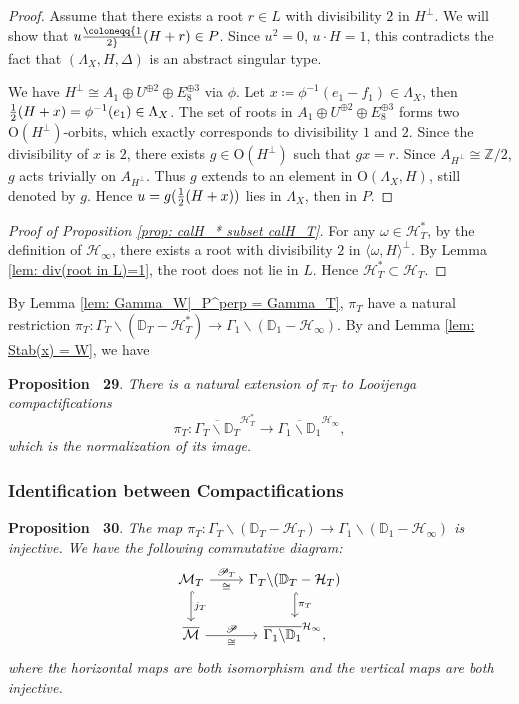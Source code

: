 \documentclass[
]{article}
\begin{document}
\emph{Proof.} Assume that there exists a root \(r\in L\) with
divisibility \(2\) in \(H^\perp\). We will show that
\(u\coloneqq {1\over2}(H+r)\in P\). Since \(u^2=0\), \(u\cdot H=1\),
this contradicts the fact that \((\Lambda_X,H,\Delta)\) is an abstract
singular type.

We have \(H^\perp\cong A_1\oplus U^{\oplus 2}\oplus E_8^{\oplus 3}\) via
\(\phi\). Let \(x\coloneqq\phi^{-1}(e_1-f_1)\in\Lambda_X\), then
\({1\over2}(H+x)=\phi^{-1}(e_1)\in\Lambda_X\). The set of roots in
\(A_1\oplus U^{\oplus 2}\oplus E_8^{\oplus 3}\) forms two
\(\mathrm{O}(H^\perp)\)-orbits, which exactly corresponds to
divisibility \(1\) and \(2\). Since the divisibility of \(x\) is \(2\),
there exists \(g\in\mathrm{O}(H^\perp)\) such that \(g x=r\). Since
\(A_{H^\perp}\cong \mathbb{Z}/2\), \(g\) acts trivially on
\(A_{H^\perp}\). Thus \(g\) extends to an element in
\(\mathrm{O}(\Lambda_X,H)\), still denoted by \(g\). Hence
\(u=g({1\over2}(H+x))\) lies in \(\Lambda_X\), then in \(P\).~◻

\emph{Proof of Proposition \ref{prop: calH_* subset calH_T}.} For any
\(\omega\in\mathcal{H}_T^*\), by the definition of
\(\mathcal{H}_\infty\), there exists a root with divisibility \(2\) in
\(\langle \omega,H \rangle^\perp\). By Lemma
\ref{lem: div(root in L)=1}, the root does not lie in \(L\). Hence
\(\mathcal{H}_T^*\subset\mathcal{H}_T\).~◻

By Lemma \ref{lem: Gamma_W|_P^perp = Gamma_T}, \(\pi_T\) have a natural
restriction
\(\pi_T\colon\Gamma_T\backslash(\mathbb{D}_T-\mathcal{H}_T^*)\to\Gamma_1\backslash(\mathbb{D}_1-\mathcal{H}_\infty)\).
By \cite[Theorem A.13]{yu2020fourfolds} and Lemma
\ref{lem: Stab(x) = W}, we have

\textbf{Proposition~ 29}. \emph{\label{prop: Loo comp: type T to total}
There is a natural extension of \(\pi_T\) to Looijenga compactifications
\[\pi_T\colon \overline{\Gamma_T\backslash\mathbb{D}_T}^{\mathcal{H}_T^*}\to \overline{\Gamma_1\backslash\mathbb{D}_1}^{\mathcal{H}_\infty},\]
which is the normalization of its image.}

\subsubsection{Identification between
Compactifications}\label{identification-between-compactifications}

\textbf{Proposition~ 30}. \emph{\label{prop: comm diag, open to compact}
The map
\(\pi_T\colon\Gamma_T\backslash(\mathbb{D}_T-\mathcal{H}_T)\to\Gamma_1\backslash(\mathbb{D}_1-\mathcal{H}_\infty)\)
is injective. We have the following commutative diagram:
\[\begin{tikzcd}
      \mathcal{M}_T  \arrow[r,"\mathscr{P}_T","\cong"'] \arrow[d,hook,"j_T"] & \Gamma_T\backslash(\mathbb{D}_T-\mathcal{H}_T) \arrow[d,hook,"\pi_T"] \\
      \overline{\mathcal{M}} \arrow[r,"\mathscr{P}","\cong"'] & \overline{\Gamma_1\backslash\mathbb{D}_1}^{\mathcal{H}_\infty},
    \end{tikzcd}\] where the horizontal maps are both isomorphism and
the vertical maps are both injective.}
\end{document}
